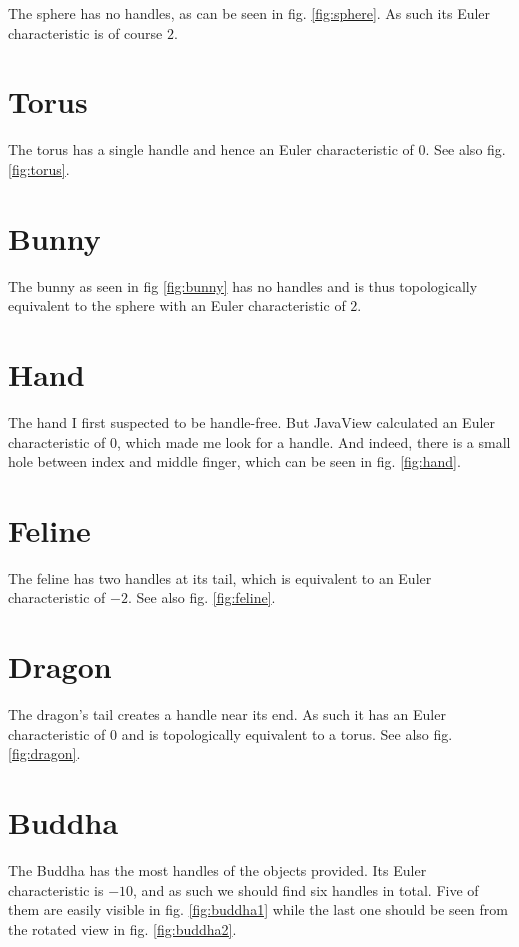 \documentclass[a4paper,10pt,notitlepage]{scrreprt}
\begin{document}
The sphere has no handles, as can be seen in fig. \ref{fig:sphere}. As such its
Euler characteristic is of course $2$.

\section{Torus}

The torus has a single handle and hence an Euler characteristic of $0$. See
also fig. \ref{fig:torus}.

\section{Bunny}

The bunny as seen in fig \ref{fig:bunny} has no handles and is thus
topologically equivalent to the sphere with an Euler characteristic of $2$.

\section{Hand}

The hand I first suspected to be handle-free. But JavaView calculated an Euler
characteristic of $0$, which made me look for a handle. And indeed, there is a
small hole between index and middle finger, which can be seen in fig.
\ref{fig:hand}.

\section{Feline}

The feline has two handles at its tail, which is equivalent to an Euler
characteristic of $-2$. See also fig. \ref{fig:feline}.

\section{Dragon}

The dragon's tail creates a handle near its end. As such it has an Euler
characteristic of $0$ and is topologically equivalent to a torus. See also fig.
\ref{fig:dragon}.

\section{Buddha}

The Buddha has the most handles of the objects provided. Its Euler
characteristic is $-10$, and as such we should find six handles in total. Five
of them are easily visible in fig. \ref{fig:buddha1} while the last one should
be seen from the rotated view in fig. \ref{fig:buddha2}.
\end{document}

